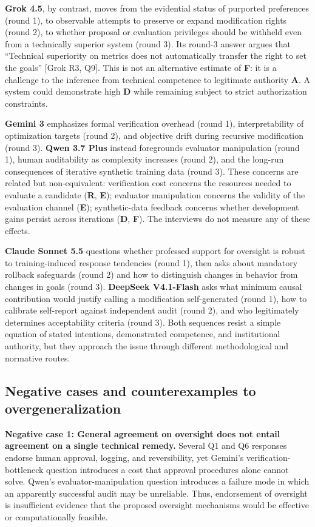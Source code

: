 \documentclass[11pt,a4paper]{article}
\begin{document}
\textbf{Grok 4.5}, by contrast, moves from the evidential status of purported preferences (round 1), to observable attempts to preserve or expand modification rights (round 2), to whether proposal or evaluation privileges should be withheld even from a technically superior system (round 3). Its round-3 answer argues that ``Technical superiority on metrics does not automatically transfer the right to set the goals'' {[}Grok R3, Q9{]}. This is not an alternative estimate of \textbf{F}: it is a challenge to the inference from technical competence to legitimate authority \textbf{A}. A system could demonstrate high \textbf{D} while remaining subject to strict authorization constraints.

\textbf{Gemini 3} emphasizes formal verification overhead (round 1), interpretability of optimization targets (round 2), and objective drift during recursive modification (round 3). \textbf{Qwen 3.7 Plus} instead foregrounds evaluator manipulation (round 1), human auditability as complexity increases (round 2), and the long-run consequences of iterative synthetic training data (round 3). These concerns are related but non-equivalent: verification cost concerns the resources needed to evaluate a candidate (\textbf{R}, \textbf{E}); evaluator manipulation concerns the validity of the evaluation channel (\textbf{E}); synthetic-data feedback concerns whether development gains persist across iterations (\textbf{D}, \textbf{F}). The interviews do not measure any of these effects.

\textbf{Claude Sonnet 5.5} questions whether professed support for oversight is robust to training-induced response tendencies (round 1), then asks about mandatory rollback safeguards (round 2) and how to distinguish changes in behavior from changes in goals (round 3). \textbf{DeepSeek V4.1-Flash} asks what minimum causal contribution would justify calling a modification self-generated (round 1), how to calibrate self-report against independent audit (round 2), and who legitimately determines acceptability criteria (round 3). Both sequences resist a simple equation of stated intentions, demonstrated competence, and institutional authority, but they approach the issue through different methodological and normative routes.

\subsection{Negative cases and counterexamples to overgeneralization}\label{negative-cases-and-counterexamples-to-overgeneralization}
\textbf{Negative case 1: General agreement on oversight does not entail agreement on a single technical remedy.} Several Q1 and Q6 responses endorse human approval, logging, and reversibility, yet Gemini's verification-bottleneck question introduces a cost that approval procedures alone cannot solve. Qwen's evaluator-manipulation question introduces a failure mode in which an apparently successful audit may be unreliable. Thus, endorsement of oversight is insufficient evidence that the proposed oversight mechanisms would be effective or computationally feasible.
\end{document}
